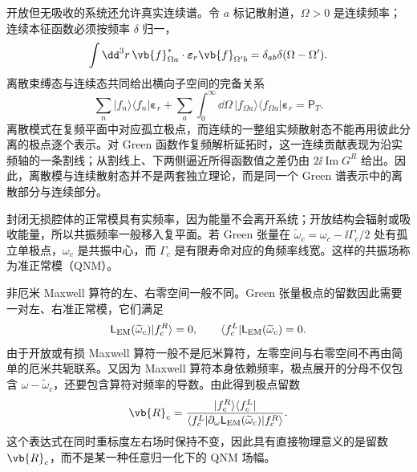 开放但无吸收的系统还允许真实连续谱。令 $a$ 标记散射道，$\Omega>0$ 是连续频率；连续本征函数必须按频率 $\delta$ 归一，
\begin{equation}
{
\int\dd^3 r\,
\vb{f}_{\Omega a}^*\cdot\boldsymbol\varepsilon_r\vb{f}_{\Omega' b}
=\delta_{ab}\delta(\Omega-\Omega').}
\label{eq:maxwell_continuum_delta_frequency_normalization}
\end{equation}
离散束缚态与连续态共同给出横向子空间的完备关系
\begin{equation}
{
\sum_n|f_n\rangle\langle f_n|\boldsymbol\varepsilon_r
+\sum_a\int_0^\infty\dd\Omega\,
|f_{\Omega a}\rangle\langle f_{\Omega a}|\boldsymbol\varepsilon_r
=\mathsf P_T.}
\label{eq:maxwell_discrete_continuum_completeness}
\end{equation}
离散模式在复频平面中对应孤立极点，而连续的一整组实频散射态不能再用彼此分离的极点逐个表示。对 Green 函数作复频解析延拓时，这一连续贡献表现为沿实频轴的一条割线；从割线上、下两侧逼近所得函数值之差仍由 $2\ii\operatorname{Im}G^R$ 给出。因此，离散模与连续散射态并不是两套独立理论，而是同一个 Green 谱表示中的离散部分与连续部分。

封闭无损腔体的正常模具有实频率，因为能量不会离开系统；开放结构会辐射或吸收能量，所以共振频率一般移入复平面。若 Green 张量在 $\widetilde\omega_c=\omega_c-\ii\Gamma_c/2$ 处有孤立单极点，$\omega_c$ 是共振中心，而 $\Gamma_c$ 是有限寿命对应的角频率线宽。这样的共振场称为准正常模（QNM）。

非厄米 Maxwell 算符的左、右零空间一般不同。Green 张量极点的留数因此需要一对左、右准正常模，它们满足
\begin{equation}
{
\mathsf L_{\rm EM}(\widetilde\omega_c)|f_c^R\rangle=0,
\qquad
\langle f_c^L|\mathsf L_{\rm EM}(\widetilde\omega_c)=0.}
\label{eq:qnm_left_right_null_vectors}
\end{equation}
由于开放或有损 Maxwell 算符一般不是厄米算符，左零空间与右零空间不再由简单的厄米共轭联系。又因为 Maxwell 算符本身依赖频率，极点展开的分母不仅包含 $\omega-\widetilde\omega_c$，还要包含算符对频率的导数。由此得到极点留数
\begin{equation}
{
\vb{R}_c
=\frac{|f_c^R\rangle\langle f_c^L|}
{\langle f_c^L|\partial_\omega\mathsf L_{\rm EM}(\widetilde\omega_c)|f_c^R\rangle}.}
\label{eq:qnm_green_residue_operator_formula}
\end{equation}
这个表达式在同时重标度左右场时保持不变，因此具有直接物理意义的是留数 $\vb{R}_c$，而不是某一种任意归一化下的 QNM 场幅。

